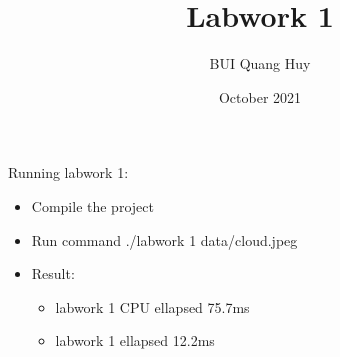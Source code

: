 \documentclass{article}
\title{Labwork 1}
\author{BUI Quang Huy}
\date{October 2021}
\begin{document}
\maketitle

Running labwork 1:
\begin{itemize}
    \item Compile the project
    \item Run command ./labwork 1 data/cloud.jpeg
    \item Result:\begin{itemize}
        \item labwork 1 CPU ellapsed 75.7ms
        \item labwork 1 ellapsed 12.2ms
    \end{itemize}
\end{itemize}
\end{document}
